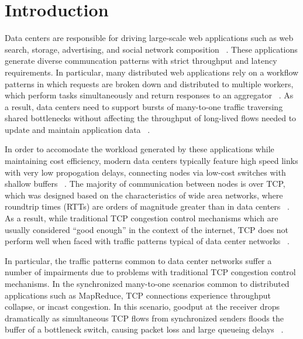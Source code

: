 \section{Introduction}

Data centers are responsible for driving large-scale web applications such as web search, storage, advertising, and social network composition ~\cite{chen_understanding_2009, alizadeh_data_2010}. These applications generate diverse communcation patterns with strict throughput and latency requirements. In particular, many distributed web applications rely on a workflow patterns in which requests are broken down and distributed to multiple workers, which perform tasks simultaneously and return responses to an aggregator ~\cite{chen_understanding_2009, alizadeh_data_2010}. As a result, data centers need to support bursts of many-to-one traffic traversing shared bottlenecks without affecting the throughput of long-lived flows needed to update and maintain application data ~\cite{alizadeh_data_2010}.

In order to accomodate the workload generated by these applications while maintaining cost efficiency, modern data centers typically feature high speed links with very low propogation delays, connecting nodes via low-cost switches with shallow buffers ~\cite{chen_understanding_2009, hamilton_designing_2007, alizadeh_data_2010}. The majority of communication between nodes is over TCP, which was designed based on the characteristics of wide area networks, where roundtrip times (RTTs) are orders of magnitude greater than in data centers ~\cite{chen_understanding_2009}. As a result, while traditional TCP congestion control mechanisms which are usually considered ``good enough'' in the context of the internet, TCP does not perform well when faced with traffic patterns typical of data center networks ~\cite{chen_understanding_2009, phanishayee_measurement_2008}. 

In particular, the traffic patterns common to data center networks suffer a number of impairments due to problems with traditional TCP congestion control mechanisms. In the synchronized many-to-one scenarios common to distributed applications such as MapReduce, TCP connections experience throughput collapse, or incast congestion. In this scenario, goodput at the receiver drops dramatically as simultaneous TCP flows from synchronized senders floods the buffer of a bottleneck switch, causing packet loss and large queueing delays ~\cite{chen_understanding_2009, phanishayee_measurement_2008, dean_mapreduce:_2004}.


